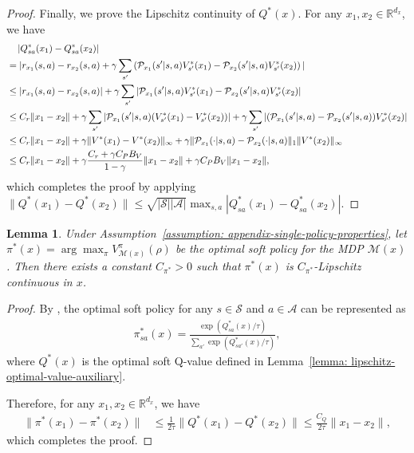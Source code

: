 \documentclass{article}
\theoremstyle{plain}
\newtheorem{lemma}{Lemma}
\theoremstyle{definition}
\theoremstyle{remark}
\def\R{\mathbb R}
\def\cA{\mathcal A}
\def\cM{\mathcal M}
\def\cP{\mathcal P}
\def\cS{\mathcal S}
\begin{document}
\begin{proof}
    Finally, we prove the Lipschitz continuity of $Q^*(x)$. For any $x_1,x_2 \in \R^{d_x}$, we have
    \begin{align}
        & \quad \, |Q^*_{sa}(x_1) - Q^*_{sa}(x_2)|\notag  \\
        & = |r_{x_1}(s,a) - r_{x_2}(s,a) + \gamma \sum_{s^\prime} \left(\cP_{x_1}(s^\prime|s,a) V^*_{s^\prime}(x_1) - \cP_{x_2}(s^\prime|s,a) V^*_{s^\prime}(x_2)\right) | \notag \\
        & \leq |r_{x_1}(s,a) - r_{x_2}(s,a)| + \gamma \sum_{s^\prime} |\cP_{x_1}(s^\prime|s,a) V^*_{s^\prime}(x_1) - \cP_{x_2}(s^\prime|s,a) V^*_{s^\prime}(x_2) | \notag \\
        & \leq C_r \|x_1 - x_2\| + \gamma \sum_{s^\prime} |\cP_{x_1}(s^\prime|s,a) (V^*_{s^\prime}(x_1) - V^*_{s^\prime}(x_2))| + \gamma \sum_{s^\prime} |(\cP_{x_1}(s^\prime|s,a) - \cP_{x_2}(s^\prime|s,a)) V^*_{s^\prime}(x_2)| \notag \\
        & \leq C_r \|x_1 - x_2\| + \gamma \| V^*(x_1) - V^*(x_2)\|_\infty + \gamma \| \cP_{x_1}(\cdot|s,a) - \cP_{x_2}(\cdot|s,a)\|_1 \| V^*(x_2)\|_\infty \notag \\
        & \leq C_r \|x_1 - x_2\| + \gamma  \frac{C_r + \gamma C_P B_V}{1-\gamma} \|x_1 - x_2\| + \gamma C_P B_V \|x_1 - x_2\|,
    \end{align}
    which completes the proof by applying $\|Q^*(x_1) - Q^*(x_2)  \| \leq \sqrt{|\cS||\cA|} \max_{s,a} |Q^*_{sa}(x_1) - Q^*_{sa}(x_2)|$.


\end{proof}

\begin{lemma}
    \label{lemma: lipschitz-of-pi-star}
    Under Assumption~\ref{assumption: appendix-single-policy-properties}, let
$\pi^*(x)=\arg\max_\pi V^\pi_{\cM(x)}(\rho)$ be the optimal soft policy for
the MDP $\cM(x)$. Then there exists a constant $C_{\pi^*}>0$ such that
$\pi^*(x)$ is $C_{\pi^*}$-Lipschitz continuous in $x$.
\end{lemma}
\begin{proof}
    By \citet{nachum2017bridging}, the optimal soft policy for any $s\in\cS$ and $a\in\cA$ can be represented as
    \begin{align}
        \pi^*_{sa}(x) = \frac{\exp (Q^*_{sa}(x)/\tau)}{\sum_{a'} \exp (Q^*_{sa'}(x)/\tau)},
    \end{align}
    where $Q^*(x)$ is the optimal soft Q-value defined in Lemma~\ref{lemma: lipschitz-optimal-value-auxiliary}.

    Therefore, for any $x_1,x_2 \in \R^{d_x}$, we have
    \begin{align}
        \| \pi^*(x_1) - \pi^*(x_2) \| & \leq \frac{1}{2\tau} \| Q^*(x_1) - Q^*(x_2) \| \leq \frac{C_Q}{2\tau} \|x_1 - x_2\|, 
    \end{align}
    which completes the proof.
\end{proof}
\end{document}
